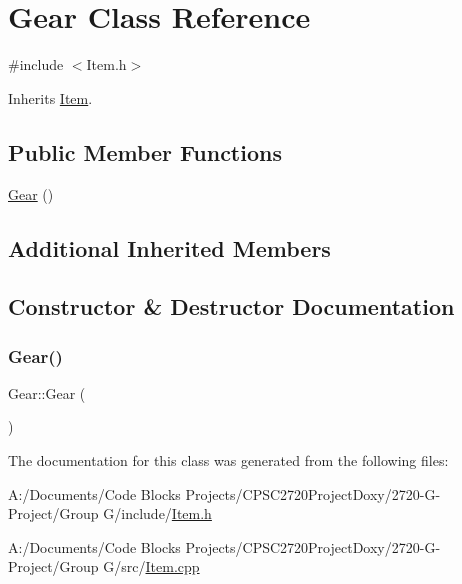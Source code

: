 \hypertarget{class_gear}{}\section{Gear Class Reference}
\label{class_gear}


{\ttfamily \#include $<$Item.\+h$>$}



Inherits \mbox{\hyperlink{class_item}{Item}}.

\subsection*{Public Member Functions}
\begin{DoxyCompactItemize}
\item 
\mbox{\hyperlink{class_gear_aeb94a7438d5b477e2c2139fbdf831c89}{Gear}} ()
\end{DoxyCompactItemize}
\subsection*{Additional Inherited Members}


\subsection{Constructor \& Destructor Documentation}
\mbox{\label{class_gear_aeb94a7438d5b477e2c2139fbdf831c89}} 
\subsubsection{\texorpdfstring{Gear()}{Gear()}}
{\footnotesize\ttfamily Gear\+::\+Gear (\begin{DoxyParamCaption}{ }\end{DoxyParamCaption})}



The documentation for this class was generated from the following files\+:\begin{DoxyCompactItemize}
\item 
A\+:/\+Documents/\+Code Blocks Projects/\+C\+P\+S\+C2720\+Project\+Doxy/2720-\/\+G-\/\+Project/\+Group G/include/\mbox{\hyperlink{_item_8h}{Item.\+h}}\item 
A\+:/\+Documents/\+Code Blocks Projects/\+C\+P\+S\+C2720\+Project\+Doxy/2720-\/\+G-\/\+Project/\+Group G/src/\mbox{\hyperlink{_item_8cpp}{Item.\+cpp}}\end{DoxyCompactItemize}
